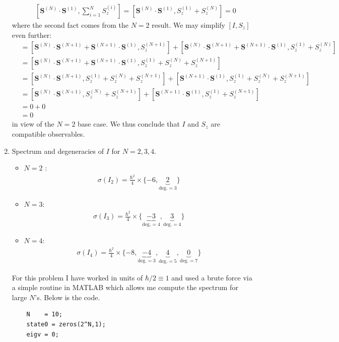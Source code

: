 \documentclass{article}
\theoremstyle{definition}
\newcommand{\f}[2]{\frac{#1}{#2}}
\newcommand{\lb}{\left[}
\newcommand{\rb}{\right]}
\begin{document}
\begin{enumerate}[label=(\alph*)]
\begin{align*}
	&\lb \mathbf{S}^{(N)}\cdot \mathbf{S}^{(1)} ,  \sum_{i=1}^N S_z^{(i)} \rb = \lb \mathbf{S}^{(N)}\cdot \mathbf{S}^{(1)}, S_z^{(1)} + S_z^{(N)} \rb = 0
	\end{align*}
	where the second fact comes from the $N=2$ result. We may simplify $[I,S_z]$ even further:
	\begin{align*}
	[I,S_z] 
	&=  \lb \mathbf{S}^{(N)}\cdot \mathbf{S}^{(N+1)} + \mathbf{S}^{(N+1)}\cdot \mathbf{S}^{(1)} , S_z^{(N+1)} \rb + \lb \mathbf{S}^{(N)}\cdot \mathbf{S}^{(N+1)} + \mathbf{S}^{(N+1)}\cdot \mathbf{S}^{(1)}  , S_z^{(1)} + S_z^{(N)}\rb \\
	&= \lb \mathbf{S}^{(N)}\cdot \mathbf{S}^{(N+1)} + \mathbf{S}^{(N+1)}\cdot \mathbf{S}^{(1)} , S_z^{(1)} + S_z^{(N)} + S_z^{(N+1)} \rb\\
	&= \lb \mathbf{S}^{(N)}\cdot \mathbf{S}^{(N+1)}, S_z^{(1)} + S_z^{(N)} + S_z^{(N+1)} \rb + \lb  \mathbf{S}^{(N+1)}\cdot \mathbf{S}^{(1)} ,  S_z^{(1)} + S_z^{(N)} + S_z^{(N+1)}\rb \\
	&= \lb \mathbf{S}^{(N)}\cdot \mathbf{S}^{(N+1)}, S_z^{(N)} + S_z^{(N+1)} \rb + \lb  \mathbf{S}^{(N+1)}\cdot \mathbf{S}^{(1)} ,  S_z^{(1)}  + S_z^{(N+1)}\rb\\
	&= 0 + 0 \\
	&=0 
	\end{align*}
	in view of the $N=2$ base case. We thus conclude that $I$ and $S_z$ are compatible observables.
	 
	
	
	\item Spectrum and degeneracies of $I$ for $N=2,3,4$. 
	\begin{itemize}
		\item $N=2$ :
		\begin{align*}
		\boxed{\sigma(I_2) =  \f{\hbar^2}{4}\times \{ -6, \underbrace{2}_{\text{deg.}=3}  \} }
		\end{align*}
		\item $N=3$:
		\begin{align*}
		\boxed{\sigma(I_3) = \f{\hbar^2}{4}\times \{ \underbrace{-3}_{\text{deg.}=4}, \underbrace{3}_{\text{deg.}=4}  \}} 
		\end{align*}
		\item $N=4$:
		\begin{align*}
		\boxed{\sigma(I_4) = \f{\hbar^2}{4}\times \{ -8, \underbrace{-4}_{\text{deg.}=3}, \underbrace{4}_{\text{deg.}=5}, \underbrace{0}_{\text{deg.}=7}  \} }
		\end{align*}
	\end{itemize}
	For this problem I have worked in units of $\hbar/2 \equiv 1$ and used a brute force via a simple routine in MATLAB which allows me compute the spectrum for large $N$'s. Below is the code. 
	\begin{lstlisting}
	N    = 10;
	state0 = zeros(2^N,1);
	eigv = 0;
	

\end{lstlisting}
\end{enumerate}
\end{document}

